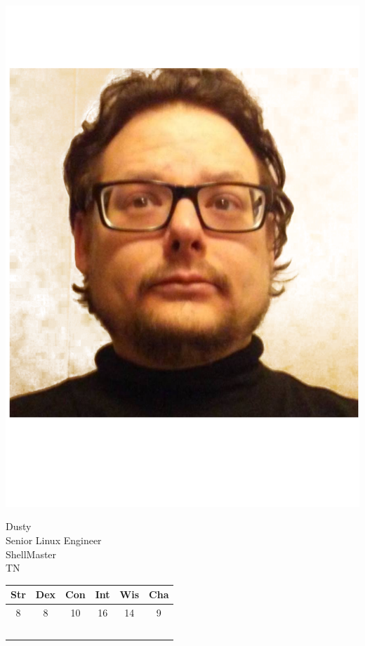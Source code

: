 \documentclass[11pt]{article}
\begin{document}
\begin{minipage}{0.5\textwidth}
\includegraphics{img/dusty.png}
\end{minipage}%
\begin{minipage}{0.5\textwidth}%
\Huge{\Fontauri Dusty } \\
\Large{Senior Linux Engineer} \\
\textcolor{OCRA}{ShellMaster} \\
TN
\vspace{1cm}
\begin{tabular}{cccccc}
Str & Dex & Con & Int & Wis & Cha \\ \hline 
8 & 8 & 10 & 16 & 14 & 9\\ 
 & $ $ & & & & $ $
\end{tabular}
\vspace{1cm} \\
\end{minipage}
\end{document}
